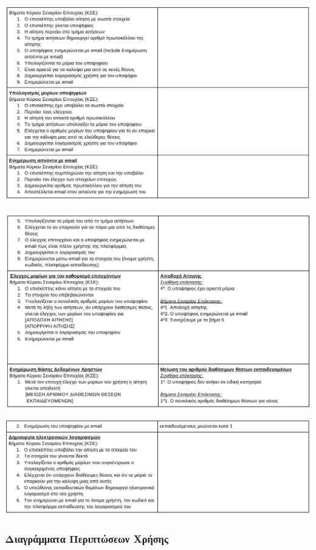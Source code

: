 \documentclass[a4paper, titlepage, twoside]{article}
\begin{document}
\begin{center}
\includegraphics[width=.9\linewidth]{2023-05-31_23-27-53_screenshot.png}
\end{center}
\begin{center}
\includegraphics[width=.9\linewidth]{2023-05-31_23-28-00_screenshot.png}
\end{center}
\begin{center}
\includegraphics[width=.9\linewidth]{2023-05-31_23-28-07_screenshot.png}
\end{center}

\subsubsection*{Διαγράμματα Περιπτώσεων Χρήσης}
\label{sec:org9c39649}
\end{document}
